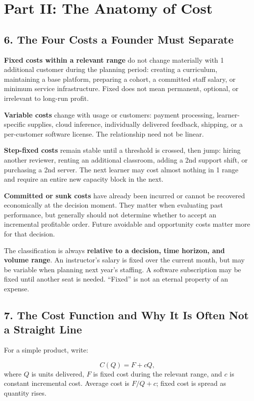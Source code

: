 \section*{Part II: The Anatomy of Cost}

\subsection*{6. The Four Costs a Founder Must Separate}

\textbf{Fixed costs within a relevant range} do not change materially with 1 additional customer during the planning period: creating a curriculum, maintaining a base platform, preparing a cohort, a committed staff salary, or minimum service infrastructure. Fixed does not mean permanent, optional, or irrelevant to long-run profit.

\textbf{Variable costs} change with usage or customers: payment processing, learner-specific supplies, cloud inference, individually delivered feedback, shipping, or a per-customer software license. The relationship need not be linear.

\textbf{Step-fixed costs} remain stable until a threshold is crossed, then jump: hiring another reviewer, renting an additional classroom, adding a 2nd support shift, or purchasing a 2nd server. The next learner may cost almost nothing in 1 range and require an entire new capacity block in the next.

\textbf{Committed or sunk costs} have already been incurred or cannot be recovered economically at the decision moment. They matter when evaluating past performance, but generally should not determine whether to accept an incremental profitable order. Future avoidable and opportunity costs matter more for that decision.

The classification is always \textbf{relative to a decision, time horizon, and volume range}. An instructor's salary is fixed over the current month, but may be variable when planning next year's staffing. A software subscription may be fixed until another seat is needed. ``Fixed'' is not an eternal property of an expense.

\subsection*{7. The Cost Function and Why It Is Often Not a Straight Line}

For a simple product, write:

\begin{equation}
C(Q) = F + cQ,
\end{equation}
where $Q$ is units delivered, $F$ is fixed cost during the relevant range, and $c$ is constant incremental cost. Average cost is $F/Q+c$; fixed cost is spread as quantity rises.

